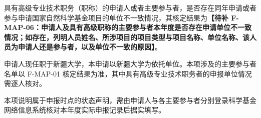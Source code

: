 \justifying
\NSFCBodyText

具有高级专业技术职务（职称）的申请人或者主要参与者，是否存在同年申请或者参与申请国家自然科学基金项目的单位不一致情况，其核定结果为\textbf{【待补 F-MAP-06：申请人及具有高级职称的主要参与者本年度是否存在申请单位不一致情况；如存在，列明人员姓名、所涉项目的项目类型与项目名称、单位名称、该人员为申请人还是参与者，以及单位不一致的原因】}。

申请人现任职于新疆大学，本申请以新疆大学为依托单位。本项涉及的主要参与者名单以 F-MAP-01 核定结果为准，其中具有高级专业技术职务者的申报单位情况需逐人核对。

本项说明属于申报时点的状态声明，需由申请人与各主要参与者分别登录科学基金网络信息系统核对本年度实际申报记录后据实填写。
